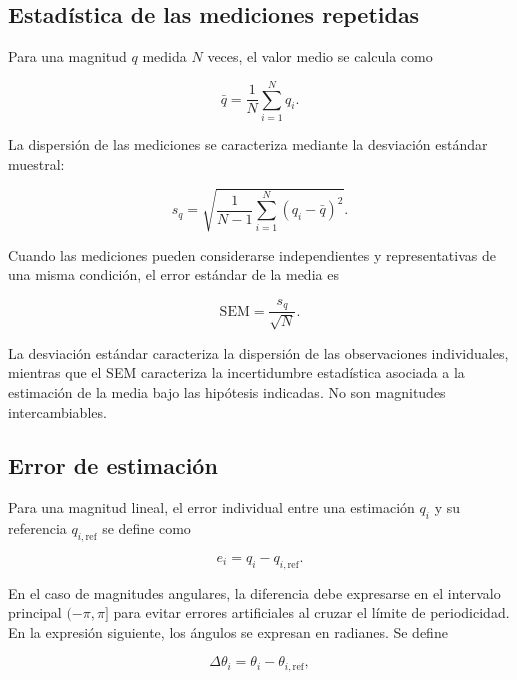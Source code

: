 \subsection{Estadística de las mediciones repetidas}

Para una magnitud $q$ medida $N$ veces, el valor
medio se calcula como

\begin{equation}
    \bar{q}=\frac{1}{N}\sum_{i=1}^{N}q_i.
    \label{eq:media_mediciones}
\end{equation}

La dispersión de las mediciones se caracteriza
mediante la desviación estándar muestral:

\begin{equation}
    s_q=
    \sqrt{
    \frac{1}{N-1}
    \sum_{i=1}^{N}(q_i-\bar{q})^2
    }.
    \label{eq:desviacion_estandar_mediciones}
\end{equation}

Cuando las mediciones pueden considerarse
independientes y representativas de una misma
condición, el error estándar de la media es

\begin{equation}
    \mathrm{SEM}=
    \frac{s_q}{\sqrt{N}}.
    \label{eq:sem_mediciones}
\end{equation}

La desviación estándar caracteriza la dispersión
de las observaciones individuales, mientras que
el SEM caracteriza la incertidumbre estadística
asociada a la estimación de la media bajo las
hipótesis indicadas. No son magnitudes
intercambiables.

\subsection{Error de estimación}

Para una magnitud lineal, el error individual
entre una estimación $q_i$ y su referencia
$q_{i,\mathrm{ref}}$ se define como

\begin{equation}
    e_i=q_i-q_{i,\mathrm{ref}}.
    \label{eq:error_individual}
\end{equation}

En el caso de magnitudes angulares, la diferencia
debe expresarse en el intervalo principal
$(-\pi,\pi]$ para evitar errores artificiales
al cruzar el límite de periodicidad. En la
expresión siguiente, los ángulos se expresan
en radianes. Se define

\begin{equation}
    \Delta\theta_i=
    \theta_i-\theta_{i,\mathrm{ref}},
\end{equation}

